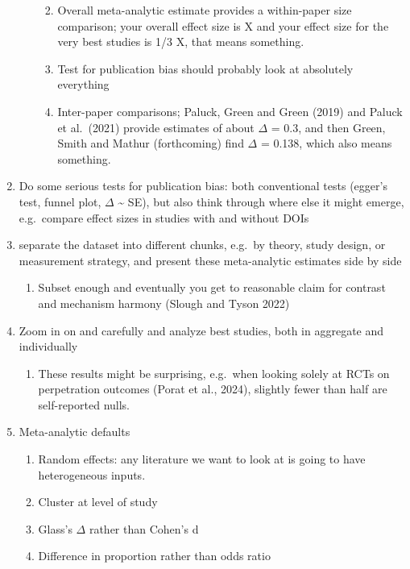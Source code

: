 \documentclass[
  man]{apa6}
\providecommand{\tightlist}{%
  \setlength{\itemsep}{0pt}\setlength{\parskip}{0pt}}
\begin{document}
\begin{enumerate}
\begin{enumerate}
    \begin{enumerate}
    \def\labelenumiii{\arabic{enumiii}.}
    \setcounter{enumiii}{3}
    \tightlist
    \item
      Overall meta-analytic estimate provides a within-paper size comparison; your overall effect size is X and your effect size for the very best studies is 1/3 X, that means something.
    \item
      Test for publication bias should probably look at absolutely everything
    \item
      Inter-paper comparisons; Paluck, Green and Green (2019) and Paluck et al.~(2021) provide estimates of about \(\Delta\) = 0.3, and then Green, Smith and Mathur (forthcoming) find \(\Delta\) = 0.138, which also means something.
    \end{enumerate}
  \end{enumerate}
\item
  Do some serious tests for publication bias: both conventional tests (egger's test, funnel plot, \(\Delta\) \textasciitilde{} SE), but also think through where else it might emerge, e.g.~compare effect sizes in studies with and without DOIs
\item
  separate the dataset into different chunks, e.g.~by theory, study design, or measurement strategy, and present these meta-analytic estimates side by side

  \begin{enumerate}
  \def\labelenumii{\arabic{enumii}.}
  \setcounter{enumii}{3}
  \tightlist
  \item
    Subset enough and eventually you get to reasonable claim for contrast and mechanism harmony (Slough and Tyson 2022)
  \end{enumerate}
\item
  Zoom in on and carefully and analyze best studies, both in aggregate and individually

  \begin{enumerate}
  \def\labelenumii{\arabic{enumii}.}
  \setcounter{enumii}{4}
  \tightlist
  \item
    These results might be surprising, e.g.~when looking solely at RCTs on perpetration outcomes (Porat et al., 2024), slightly fewer than half are self-reported nulls.
  \end{enumerate}
\item
  Meta-analytic defaults

  \begin{enumerate}
  \def\labelenumii{\arabic{enumii}.}
  \setcounter{enumii}{5}
  \tightlist
  \item
    Random effects: any literature we want to look at is going to have heterogeneous inputs.
  \item
    Cluster at level of study
  \item
    Glass's \(\Delta\) rather than Cohen's d
  \item
    Difference in proportion rather than odds ratio


\end{enumerate}
\end{enumerate}
\end{document}
